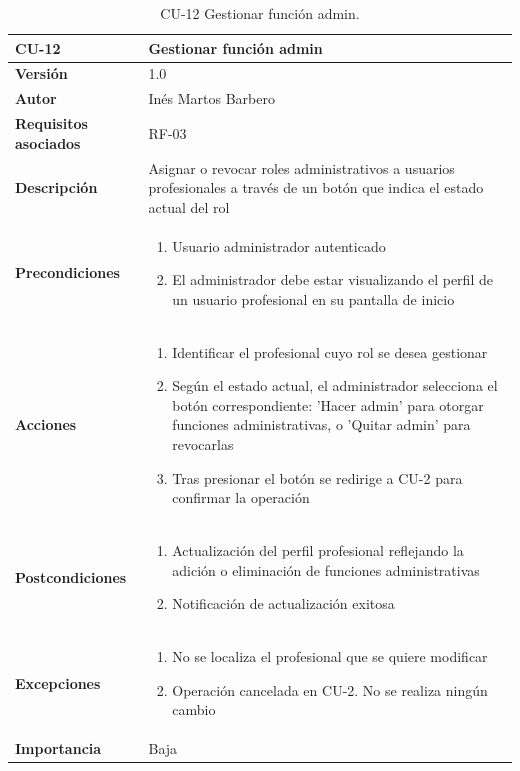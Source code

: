 \begin{table}[p]
	\centering
	\begin{tabularx}{\linewidth}{ p{} p{} }
		\toprule
		\textbf{CU-12}    & \textbf{Gestionar función admin}\\
		\toprule
		\textbf{Versión}              & 1.0    \\
		\textbf{Autor}                & Inés Martos Barbero \\
		\textbf{Requisitos asociados} & RF-03 \\
		\textbf{Descripción}          & Asignar o revocar roles administrativos a usuarios profesionales a través de un botón que indica el estado actual del rol \\
		\textbf{Precondiciones}         & 
            \begin{enumerate}
    			\def\labelenumi{\arabic{enumi}.}
    			\tightlist
    			\item Usuario administrador autenticado
    			\item El administrador debe estar visualizando el perfil de un usuario profesional en su pantalla de inicio
		  \end{enumerate}\\
		\textbf{Acciones}             &
		\begin{enumerate}
			\def\labelenumi{\arabic{enumi}.}
			\tightlist
			\item Identificar el profesional cuyo rol se desea gestionar
			\item Según el estado actual, el administrador selecciona el botón correspondiente: 'Hacer admin' para otorgar funciones administrativas, o 'Quitar admin' para revocarlas
            \item Tras presionar el botón se redirige a CU-2 para confirmar la operación
		\end{enumerate}\\
		\textbf{Postcondiciones}        & 
            \begin{enumerate}
    			\def\labelenumi{\arabic{enumi}.}
    			\tightlist
    			\item Actualización del perfil profesional reflejando la adición o eliminación de funciones administrativas
    			\item Notificación de actualización exitosa
		  \end{enumerate}\\
		\textbf{Excepciones}          & 
            \begin{enumerate}
    			\def\labelenumi{\arabic{enumi}.}
    			\tightlist
    			\item No se localiza el profesional que se quiere modificar
    			\item Operación cancelada en CU-2. No se realiza ningún cambio
		  \end{enumerate}\\
		\textbf{Importancia}          & Baja \\
		\bottomrule
	\end{tabularx}
	\caption{CU-12 Gestionar función admin.}
\end{table}

